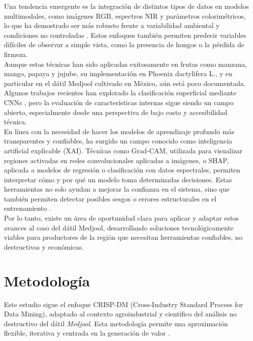 Una tendencia emergente es la integración de distintos tipos de datos en modelos multimodales, como imágenes RGB, espectros NIR y parámetros colorimétricos, lo que ha demostrado ser más robusto frente a variabilidad ambiental y condiciones no controladas \parencite{said_smartripen_2025, passos_deep_2023}. Estos enfoques también permiten predecir variables difíciles de observar a simple vista, como la presencia de hongos o la pérdida de firmeza.\\

Aunque estas técnicas han sido aplicadas exitosamente en frutas como manzana, mango, papaya y jujube, su implementación en Phoenix dactylifera L., y en particular en el dátil Medjool cultivado en México, aún está poco documentada. Algunos trabajos recientes han explorado la clasificación superficial mediante CNNs \parencite{perez-perez_evaluation_2021}, pero la evaluación de características internas sigue siendo un campo abierto, especialmente desde una perspectiva de bajo costo y accesibilidad técnica.\\

En línea con la necesidad de hacer los modelos de aprendizaje profundo más transparentes y confiables, ha surgido un campo conocido como inteligencia artificial explicable (XAI). Técnicas como Grad-CAM, utilizada para visualizar regiones activadas en redes convolucionales aplicadas a imágenes, o SHAP, aplicada a modelos de regresión o clasificación con datos espectrales, permiten interpretar cómo y por qué un modelo toma determinadas decisiones. Estas herramientas no solo ayudan a mejorar la confianza en el sistema, sino que también permiten detectar posibles sesgos o errores estructurales en el entrenamiento \parencite{russel_wavelet_2024, gupta_fruveg-net_2024}.\\

Por lo tanto, existe un área de oportunidad clara para aplicar y adaptar estos avances al caso del dátil Medjool, desarrollando soluciones tecnológicamente viables para productores de la región que necesitan herramientas confiables, no destructivas y económicas.

\newpage


\section{Metodología}

Este estudio sigue el enfoque CRISP-DM (Cross-Industry Standard Process for Data Mining), adaptado al contexto agroindustrial y científico del análisis no destructivo del dátil \textit{Medjool}. Esta metodología permite una aproximación flexible, iterativa y centrada en la generación de valor \parencite{shimaoka_evolution_2024, saltz_crisp-dm_2021}.

